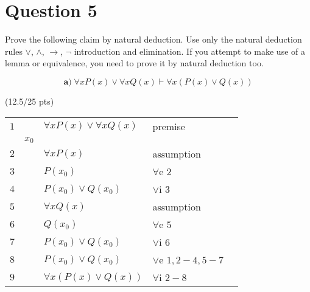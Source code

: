 \documentclass[a4paper,12pt]{article}
\newcommand\tab[1][1cm]{\hspace*{#1}}
\begin{document}
\newpage
\section*{Question 5 \hfill {}}
\tab Prove the following claim by natural deduction. Use only the natural deduction rules $\vee$, $\wedge$, $\rightarrow$, $\neg$ introduction and elimination. If you attempt to make use of a lemma or equivalence, you need to prove it by natural deduction too.


\begin{equation*}
    \textbf{a)} \; \forall x P(x) \vee \forall x Q(x) \vdash \forall x (P(x) \vee Q(x)) 
\end{equation*}

\hfill \small{(12.5/25 pts)}\\
\begin{tcolorbox}
\centering
\begin{tabular}{l l l l l}
    $1$ & & $\forall x P(x) \vee \forall x Q(x)$ & premise & \\ \cline{2-5}
    
        & \multicolumn{1}{|l}{$x_0$} & & & \multicolumn{1}{l|}{} \\ \cline{3-4}
    
    $2$ & \multicolumn{1}{|l}{} & \multicolumn{1}{|l}{$\forall x P(x)$} & \multicolumn{1}{l|}{assumption} & \multicolumn{1}{l|}{} \\
    
    $3$ & \multicolumn{1}{|l}{} & \multicolumn{1}{|l}{$P(x_0)$} & \multicolumn{1}{l|}{$\forall$e $2$} & \multicolumn{1}{l|}{} \\
    
    $4$ & \multicolumn{1}{|l}{} & \multicolumn{1}{|l}{$P(x_0) \vee Q(x_0)$} & \multicolumn{1}{l|}{$\vee$i $3$} & \multicolumn{1}{l|}{} \\ \cline{3-4} \cline{3-4}
    
    
    $5$ & \multicolumn{1}{|l}{} & \multicolumn{1}{|l}{$\forall x Q(x)$} & \multicolumn{1}{l|}{assumption} & \multicolumn{1}{l|}{} \\
    
    $6$ & \multicolumn{1}{|l}{} & \multicolumn{1}{|l}{$Q(x_0)$} & \multicolumn{1}{l|}{$\forall$e $5$} & \multicolumn{1}{l|}{} \\
    
    $7$ & \multicolumn{1}{|l}{} & \multicolumn{1}{|l}{$P(x_0) \vee Q(x_0)$} & \multicolumn{1}{l|}{$\vee$i $6$} & \multicolumn{1}{l|}{} \\ \cline{3-4}
    
    $8$ & \multicolumn{1}{|l}{} & $P(x_0) \vee Q(x_0)$ & $\vee$e $1,2-4,5-7$ & \multicolumn{1}{l|}{} \\ \cline{2-5}
    
    $9$ & & $\forall x (P(x) \vee Q(x))$ & $\forall$i $2-8$ &
\end{tabular}
\end{tcolorbox}
\end{document}
